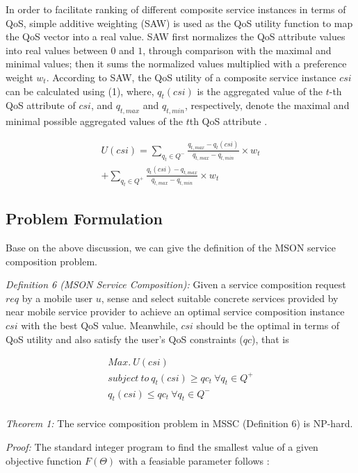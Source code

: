 \documentclass[10pt,journal,compsoc]{IEEEtran}
\begin{document}
In order to facilitate ranking of different composite service instances in terms of QoS, simple additive weighting (SAW) is used as the QoS utility function to map the QoS vector into a real value. SAW first normalizes the QoS attribute values into real values between $0$ and $1$, through comparison with the maximal and minimal values; then it sums the normalized values multiplied with a preference weight $w_t$. According to SAW, the QoS utility of a composite service instance $csi$ can be calculated using (1), where, $q_t(csi)$ is the aggregated value of the $t$-th QoS attribute of $csi$, and $q_{t,max}$ and $q_{t,min}$, respectively, denote the maximal and minimal possible aggregated values of the $t$th QoS attribute \cite{Wu2016}.

\begin{eqnarray}
U(csi) = \sum_{q_t \in Q^-} \frac{q_{t,max}-q_t(csi)}{q_{t,max}-q_{t,min}}\times w_t \\\nonumber
+\sum_{q_t \in Q^+} \frac{q_t(csi)-q_{t,max}}{q_{t,max}-q_{t,min}}\times w_t
\end{eqnarray}

\subsection{Problem Formulation}
Base on the above discussion, we can give the definition of the MSON service composition problem.

\textit{Definition 6 (MSON Service Composition):} Given a service composition request $req$ by a mobile user $u$, sense and select suitable concrete services provided by near mobile service provider to achieve an optimal service composition instance $csi$ with the best QoS value. Meanwhile, $csi$  should be the optimal in terms of QoS utility and also satisfy the user’s QoS constraints ($qc$), that is

\begin{eqnarray}
Max. \ U(csi)\\\nonumber
subject \ to \ 
q_t(csi) \ge qc_t \ \forall q_t \in Q^{+} \\\nonumber
q_t(csi) \le qc_t \ \forall q_t \in Q^{-} \\\nonumber
\end{eqnarray}

\textit{Theorem 1:} The service composition problem in MSSC (Definition 6) is NP-hard.

\textit{Proof:} The standard integer program to find the smallest value of a given objective function $F( \Theta)$ with a feasiable parameter follows \cite{glover1986future}:
\end{document}
